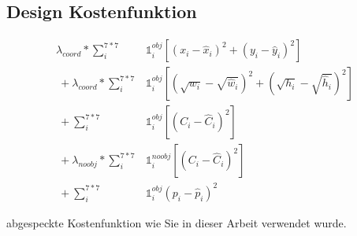 \subsection{Design Kostenfunktion}
\label{chapter:design_kostenfunktion}

\begin{eqfloat}
\begin{equation}
\begin{split}
	\lambda_{coord} * \sum_{i}^{7*7}& \mathds{1}_{i}^{obj}[(x_{i}-\hat{x}_i)^{2} + (y_{i}-\hat{y}_i)^{2}] \\\
	+ \lambda_{coord} * \sum_{i}^{7*7}& \mathds{1}_{i}^{obj}[(\sqrt{w_{i}}-\sqrt{\hat{w}_{i}})^{2}+(\sqrt{h_{i}}-\sqrt{\hat{h}_{i}})^{2}] \\\
	+ \sum_{i}^{7*7}& \mathds{1}_{i}^{obj}[(C_{i} - \hat{C}_{i})^{2}] \\\
	+ \lambda_{noobj} * \sum_{i}^{7*7}& \mathds{1}_{i}^{noobj} [(C_{i} - \hat{C}_{i})^{2}] \\\
	+ \sum_{i}^{7*7}&\mathds{1}_{i}^{obj} (p_{i}-\hat{p}_{i})^{2}
\end{split} 
\end{equation}
\caption{abgespeckte Kostenfunktion wie Sie in dieser Arbeit verwendet wurde.}
\label{eq:Kostenfunktion}
\end{eqfloat}



